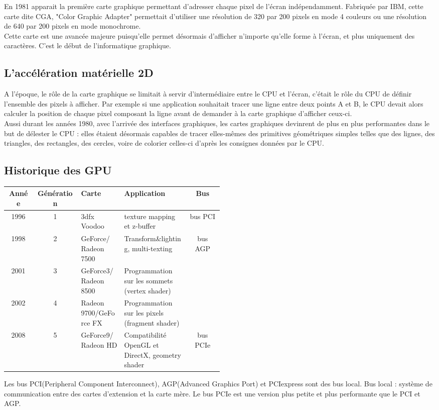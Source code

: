 En 1981 apparait la première carte graphique permettant d'adresser chaque pixel de l'écran indépendamment.
Fabriquée par IBM, cette carte dite CGA, "Color Graphic Adapter" permettait d'utiliser une résolution de 320 par 200 pixels en mode 4 couleurs ou une résolution de 640 par 200 pixels en mode monochrome.\\
Cette carte est une avancée majeure puisqu'elle permet désormais d'afficher n'importe qu'elle forme à l'écran, et plus uniquement des caractères. C'est le début de l'informatique graphique.

\subsection{L'accélération matérielle 2D}

A l'époque, le rôle de la carte graphique se limitait à servir d'intermédiaire entre le CPU et l'écran, c'était le rôle du CPU de définir l'ensemble des pixels à afficher. Par exemple si une application souhaitait tracer une ligne entre deux points A et B, le CPU devait alors calculer la position de chaque pixel composant la ligne avant de demander à la carte graphique d'afficher ceux-ci.\\
Aussi durant les années 1980, avec l'arrivée des interfaces graphiques, les cartes graphiques devinrent de plus en plus performantes dans le but de délester le CPU : elles étaient désormais capables de tracer elles-mêmes des primitives géométriques simples telles que des lignes, des triangles, des rectangles, des cercles, voire de colorier celles-ci d'après les consignes données par le CPU.\\


\subsection{Historique des GPU}
\begin{center}
\begin{tabular}{|c|c|m{0.2\linewidth}|m{0.3\linewidth} |c|}
\hline
Année & Génération & Carte & Application & Bus \\
\hline
1996 & 1 & 3dfx Voodoo & texture mapping et z-buffer & bus PCI\\
\hline
1998 & 2 & GeForce/ Radeon 7500 & Transform\&lighting, multi-texting & bus AGP \\
\cline{1-4}
2001 & 3 & GeForce3/ Radeon 8500 & Programmation sur les sommets (vertex shader)	& \\
\cline{1-4}
2002 & 4 & Radeon 9700/GeForce FX & Programmation sur les pixels (fragment shader)	& \\
\hline
2008 & 5 & GeForce9/ Radeon HD & Compatibilité OpenGL et DirectX,  geometry shader & bus PCIe \\
\hline
\end{tabular}
\end{center}

Les bus PCI(Peripheral Component Interconnect), AGP(Advanced Graphics Port) et  PCIexpress sont des bus local.
Bus local : système de communication entre des cartes d’extension et la carte mère.
Le bus PCIe est une version plus petite et plus performante que le PCI et AGP.


